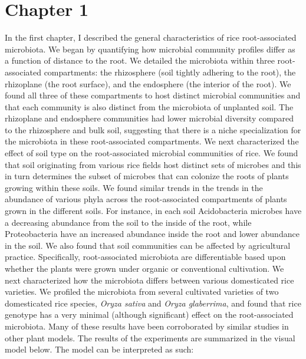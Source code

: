 \section{Chapter 1}
In the first chapter, I described the general characteristics of rice root-associated microbiota. We began by quantifying how microbial community profiles differ as a function of distance to the root. We detailed the microbiota within three root-associated compartments: the rhizosphere (soil tightly adhering to the root), the rhizoplane (the root surface), and the endosphere (the interior of the root). We found all three of these compartments to host distinct microbial communities and that each community is also distinct from the microbiota of unplanted soil. The rhizoplane and endosphere communities had lower microbial diversity compared to the rhizosphere and bulk soil, suggesting that there is a niche specialization for the microbiota in these root-associated compartments. We next characterized the effect of soil type on the root-associated microbial communities of rice. We found that soil originating from various rice fields host distinct sets of microbes and this in turn determines the subset of microbes that can colonize the roots of plants growing within these soils. We found similar trends in the trends in the abundance of various phyla across the root-associated compartments of plants grown in the different soils. For instance, in each soil Acidobacteria microbes have a decreasing abundance from the soil to the inside of the root, while Proteobacteria have an increased abundance inside the root and lower abundance in the soil. We also found that soil communities can be affected by agricultural practice. Specifically, root-associated microbiota are differentiable based upon whether the plants were grown under organic or conventional cultivation. We next characterized how the microbiota differs between various domesticated rice varieties. We profiled the microbiota from several cultivated varieties of two domesticated rice species, \textit{Oryza sativa} and \textit{Oryza glaberrima}, and found that rice genotype has a very minimal (although significant) effect on the root-associated microbiota. Many of these results have been corroborated by similar studies in other plant models. The results of the experiments are summarized in the visual model below. The model can be interpreted as such:
